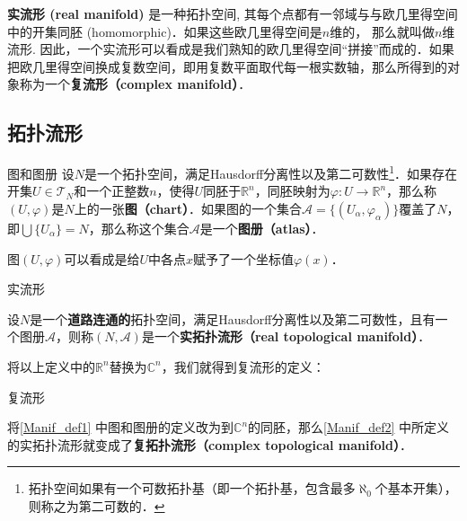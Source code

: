 


\textbf{实流形 (real manifold)} 是一种拓扑空间, 其每个点都有一邻域与与欧几里得空间中的开集同胚 (homomorphic)．如果这些欧几里得空间是$n$维的， 那么就叫做$n$维流形. 因此，一个实流形可以看成是我们熟知的欧几里得空间“拼接”而成的．如果把欧几里得空间换成复数空间，即用复数平面取代每一根实数轴，那么所得到的对象称为一个\textbf{复流形（complex manifold）}．

\subsection{拓扑流形}

\begin{definition}{图和图册}\label{Manif_def1}
设$N$是一个拓扑空间，满足Hausdorff分离性以及第二可数性\footnote{拓扑空间如果有一个可数拓扑基（即一个拓扑基，包含最多$\aleph_0$个基本开集），则称之为第二可数的．}．如果存在开集$U\in\mathcal{T}_N$和一个正整数$n$，使得$U$同胚于$\mathbb{R}^n$，同胚映射为$\varphi:U\rightarrow\mathbb{R}^n$，那么称$(U,\varphi)$是$N$上的一张\textbf{图（chart）}．如果图的一个集合$\mathcal{A}=\{(U_\alpha, \varphi_\alpha)\}$覆盖了$N$，即$\bigcup\{U_\alpha\}=N$，那么称这个集合$\mathcal{A}$是一个\textbf{图册（atlas）}．
\end{definition}

图$(U, \varphi)$可以看成是给$U$中各点$x$赋予了一个坐标值$\varphi(x)$．

\begin{definition}{实流形}\label{Manif_def2}

设$N$是一个\textbf{道路连通的}拓扑空间，满足Hausdorff分离性以及第二可数性，且有一个图册$\mathcal{A}$，则称$(N, \mathcal{A})$是一个\textbf{实拓扑流形（real topological manifold）}．

\end{definition}

将以上定义中的$\mathbb{R}^n$替换为$\mathbb{C}^n$，我们就得到复流形的定义：

\begin{definition}{复流形}

将\autoref{Manif_def1} 中图和图册的定义改为到$\mathbb{C}^n$的同胚，那么\autoref{Manif_def2} 中所定义的实拓扑流形就变成了\textbf{复拓扑流形（complex topological manifold）}．

\end{definition}

